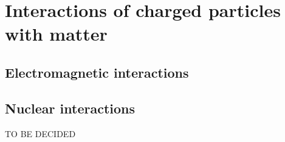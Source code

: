 \chapter{Interactions of charged particles with matter}\label{ch:interaction_charged_particles}
\section{Electromagnetic interactions}
\section{Nuclear interactions}
TO BE DECIDED

